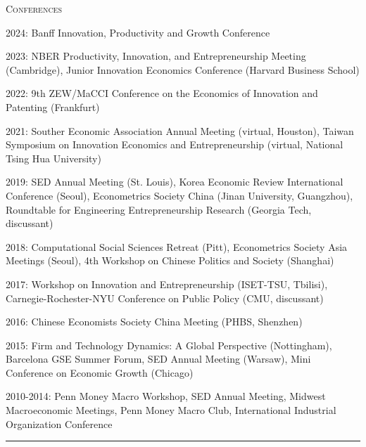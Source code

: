 \documentclass{article}
\begin{document}
\parbox{\textwidth}{
\parbox[t]{0.28\textwidth}{ \raggedright \noindent \textsc{ Conferences } }
\parbox[t]{0.72\textwidth}{ \raggedright

2024: Banff Innovation, Productivity and Growth Conference
\vspace{0.27cm}

2023: NBER Productivity, Innovation, and Entrepreneurship Meeting (Cambridge), Junior Innovation Economics Conference (Harvard Business School)
\vspace{0.27cm}

2022: 9th ZEW/MaCCI Conference on the Economics of Innovation and Patenting (Frankfurt)
\vspace{0.27cm}

2021: Souther Economic Association Annual Meeting (virtual, Houston), Taiwan Symposium on Innovation Economics and Entrepreneurship (virtual, National Tsing Hua University)
\vspace{0.27cm}

2019: SED Annual Meeting (St. Louis), Korea Economic Review International Conference (Seoul), Econometrics Society China (Jinan University, Guangzhou), Roundtable for Engineering Entrepreneurship Research (Georgia Tech, discussant)
\vspace{0.27cm}

2018: Computational Social Sciences Retreat (Pitt), Econometrics Society Asia Meetings (Seoul), 4th Workshop on Chinese Politics and Society (Shanghai)
\vspace{0.27cm}

2017: Workshop on Innovation and Entrepreneurship (ISET-TSU, Tbilisi), Carnegie-Rochester-NYU Conference on Public Policy (CMU, discussant)
\vspace{0.27cm}

2016: Chinese Economists Society China Meeting (PHBS, Shenzhen)
\vspace{0.27cm}

2015: Firm and Technology Dynamics: A Global Perspective (Nottingham), Barcelona GSE Summer Forum, SED Annual Meeting (Warsaw), Mini Conference on Economic Growth (Chicago)
\vspace{0.27cm}

2010-2014: Penn Money Macro Workshop, SED Annual Meeting, Midwest Macroeconomic Meetings, Penn Money Macro Club, International Industrial Organization Conference
\vspace{0.27cm}

}
\textcolor{light-gray}{\hrule}
}
\vspace{0.3cm}
\end{document}

